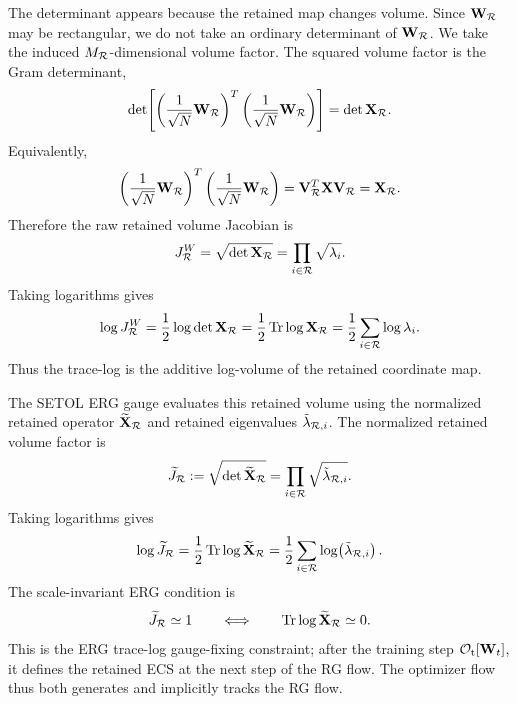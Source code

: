 The determinant appears because the retained map changes volume.  Since $\mathbf W_{\mathcal R}$ may be rectangular, we do not take an ordinary determinant of $\mathbf W_{\mathcal R}$.  We take the induced $M_{\mathcal R}$-dimensional volume factor.  The squared volume factor is the Gram determinant,
\begin{equation}
    \det\!\left[
    \left(\frac{1}{\sqrt N}\mathbf W_{\mathcal R}\right)^T
    \left(\frac{1}{\sqrt N}\mathbf W_{\mathcal R}\right)
    \right]
    =
    \det\mathbf X_{\mathcal R} .
    \label{eq:gram_det_operational_v5}
\end{equation}
Equivalently,
\begin{equation}
    \left(\frac{1}{\sqrt N}\mathbf W_{\mathcal R}\right)^T
    \left(\frac{1}{\sqrt N}\mathbf W_{\mathcal R}\right)
    =
    \mathbf V_{\mathcal R}^{T}\mathbf X\mathbf V_{\mathcal R}
    =
    \mathbf X_{\mathcal R} .
    \label{eq:retained_gram_operator_operational_v5}
\end{equation}
Therefore the raw retained volume Jacobian is
\begin{equation}
    J_{\mathcal R}^{W}
    =
    \sqrt{\det\mathbf X_{\mathcal R}}
    =
    \prod_{i\in\mathcal R}\sqrt{\lambda_i} .
    \label{eq:retained_volume_jacobian_operational_v5}
\end{equation}
Taking logarithms gives
\begin{equation}
    \log J_{\mathcal R}^{W}
    =
    \frac12\log\det\mathbf X_{\mathcal R}
    =
    \frac12\operatorname{Tr}\log\mathbf X_{\mathcal R}
    =
    \frac12\sum_{i\in\mathcal R}\log\lambda_i .
    \label{eq:retained_log_jacobian_operational_v5}
\end{equation}
Thus the trace-log is the additive log-volume of the retained coordinate map.

The SETOL ERG gauge evaluates this retained volume using the normalized retained operator $\widetilde{\mathbf X}_{\mathcal R}$ and retained eigenvalues $\tilde\lambda_{\mathcal R,i}$.  The normalized retained volume factor is
\begin{equation}
    \widetilde J_{\mathcal R}
    :=
    \sqrt{\det\widetilde{\mathbf X}_{\mathcal R}}
    =
    \prod_{i\in\mathcal R}\sqrt{\tilde\lambda_{\mathcal R,i}} .
    \label{eq:relative_jacobian_operational_v5}
\end{equation}
Taking logarithms gives
\begin{equation}
    \log\widetilde J_{\mathcal R}
    =
    \frac12\operatorname{Tr}\log\widetilde{\mathbf X}_{\mathcal R}
    =
    \frac12\sum_{i\in\mathcal R}\log\!\left(\tilde\lambda_{\mathcal R,i}\right).
    \label{eq:relative_log_jacobian_operational_v5}
\end{equation}
The scale-invariant ERG condition is
\begin{equation}
    \widetilde J_{\mathcal R}\simeq1
    \qquad\Longleftrightarrow\qquad
    \operatorname{Tr}\log\widetilde{\mathbf X}_{\mathcal R}\simeq0 .
    \label{eq:trace_log_condition_operational_v5}
\end{equation}
This is the ERG trace-log gauge-fixing constraint; after the training step $\mathcal O_{\rm t}[\mathbf W_t]$, it defines the retained ECS at the next step of the RG flow.
The optimizer flow thus both generates and implicitly tracks the RG flow.


